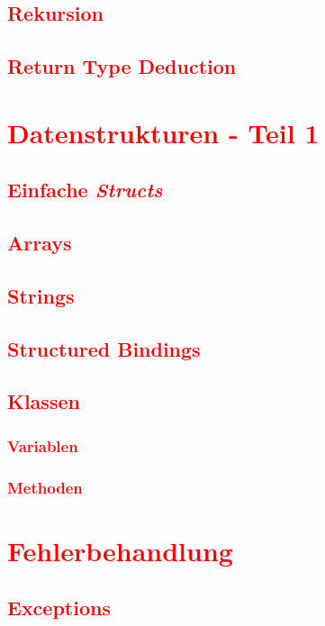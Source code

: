 \section{\textcolor{red}{Rekursion}}\label{sec:recursion}
\section{\textcolor{red}{Return Type Deduction}}\label{sec:return-type-deduction}

\chapter{\textcolor{red}{Datenstrukturen - Teil 1}}\label{chap:datastructures-1}
\section{\textcolor{red}{Einfache \textit{Structs}}}\label{sec:structs}
\section{\textcolor{red}{Arrays}}\label{sec:arrays}
\section{\textcolor{red}{Strings}}\label{sec:strings}
\section{\textcolor{red}{Structured Bindings}}\label{sec:structured-bindings}
\section{\textcolor{red}{Klassen}}\label{sec:classes}
\subsection{\textcolor{red}{Variablen}}\label{sec:class-variables}
\subsection{\textcolor{red}{Methoden}}\label{sec:class-methods}

\chapter{\textcolor{red}{Fehlerbehandlung}}\label{chap:error-handling}
\section{\textcolor{red}{Exceptions}}\label{sec:exceptions}
